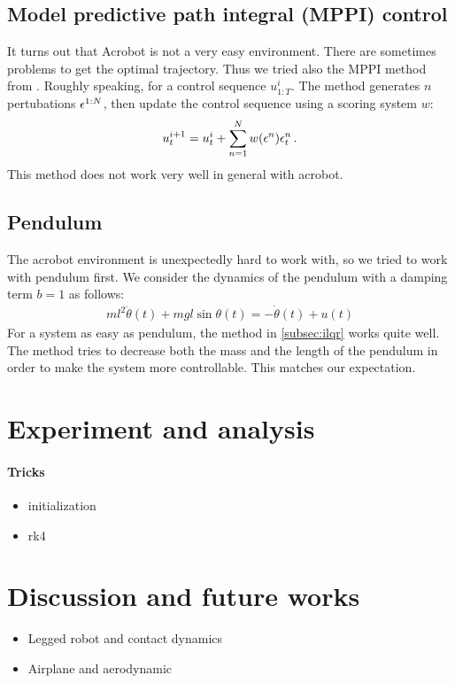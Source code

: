 \documentclass[conference]{IEEEtran}
\begin{document}
\subsection{Model predictive path integral (MPPI) control}
It turns out that Acrobot is not a very easy environment. There are sometimes problems to get the optimal trajectory. Thus we tried also the MPPI method from \cite{williams2017information}. Roughly speaking, for a control sequence $u^i_{1:T}$. The method generates $n$ pertubations $\epsilon^{1:N}$, then update the control sequence using a scoring system $w$:
\begin{align*}
u_t^{i+1} = u_t^i +  \sum\limits_{n=1}^{N} w(\epsilon^n) \epsilon^n_t\,.
\end{align*}
This method does not work very well in general with acrobot.

\subsection{Pendulum}

The acrobot environment is unexpectedly hard to work with, so we tried to work with pendulum first. We consider the dynamics of the pendulum with a damping term $b=1$ as follows:
\begin{align*}
ml^2\ddot{\theta}(t) + mgl \sin \theta(t) = -\dot{\theta}(t) + u(t)
\end{align*}
For a system as easy as pendulum, the method in \ref{subsec:ilqr} works quite well. The method tries to decrease both the mass and the length of the pendulum in order to make the system more controllable. This matches our expectation. 




\section{Experiment and analysis}

\paragraph{Tricks} 
\begin{itemize}
    \item initialization
    \item rk4 
\end{itemize}

\section{Discussion and future works}

\begin{itemize}
    \item Legged robot and contact dynamics
    \item Airplane and aerodynamic
\end{itemize}






\end{document}
